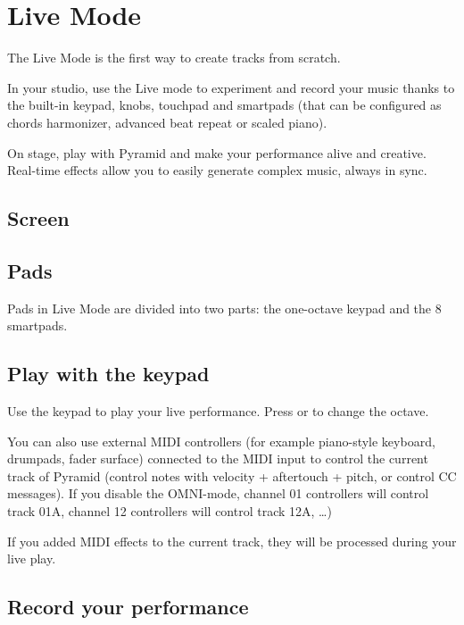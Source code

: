 \chapter{Live Mode}

The Live Mode is the first way to create tracks from scratch.

In your studio, use the Live mode to experiment and record your music thanks to the built-in keypad, knobs, touchpad and smartpads (that can be configured as chords harmonizer, advanced beat repeat or scaled piano).

On stage, play with Pyramid and make your performance alive and creative. Real-time effects allow you to easily generate complex music, always in sync.


\section{Screen}




\section{Pads}

Pads in Live Mode are divided into two parts: the one-octave keypad and the 8 smartpads.



\section{Play with the keypad}

Use the keypad \keypadicon{} to play your live performance. Press \btn{<} or \btn{>} to change the octave.

You can also use external MIDI controllers (for example piano-style keyboard, drumpads, fader surface) connected to the MIDI input to control the current track of Pyramid (control notes with velocity + aftertouch + pitch, or control CC messages). If you disable the OMNI-mode, channel 01 controllers will control track 01A, channel 12 controllers will control track 12A, \ldots)

If you added MIDI effects to the current track, they will be processed during your live play.


\section{Record your performance}

